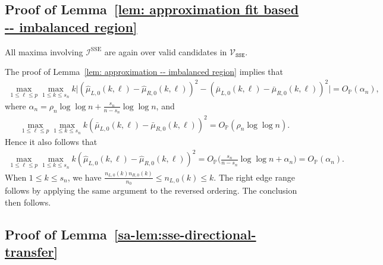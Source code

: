 \documentclass[10pt]{article}
\def\P{\mathbb{P}}
\def\I{\mathscr{I}}
\theoremstyle{definition}
\theoremstyle{remark}
\begin{document}
\subsection{Proof of Lemma~\ref{lem: approximation fit based -- imbalanced region}}
All maxima involving $\I^{\text{SSE}}$ are again over valid candidates in $\mathcal{V}_{\mathtt{SSE}}$.

The proof of Lemma~\ref{lem: approximation -- imbalanced region} implies that
\begin{align*}
    \max_{1 \leq \ell \leq p} \max_{1 \leq k \leq s_n} k\bigg|(\hat \mu_{L,0}(k,\ell) - \hat \mu_{R,0}(k,\ell))^2 - (\bar \mu_{L,0}(k,\ell) - \bar \mu_{R,0}(k,\ell))^2\bigg| = O_\P(\alpha_n),
\end{align*}
where $\alpha_n = \rho_n \log \log n + \frac{s_n}{n - s_n} \log \log n$, and \begin{align*}
    \max_{1 \leq \ell \leq p} \max_{1 \leq k \leq s_n} k (\bar \mu_{L,0}(k,\ell) - \bar \mu_{R,0}(k,\ell))^2  = O_\P(\rho_n \log \log n).
\end{align*}
Hence it also follows that 
\begin{align*}
    \max_{1 \leq \ell \leq p} \max_{1 \leq k \leq s_n} k (\hat \mu_{L,0}(k,\ell) - \hat \mu_{R,0}(k,\ell))^2  = O_\P \Big(\frac{s_n}{n - s_n} \log \log n + \alpha_n \Big) = O_\P(\alpha_n).
\end{align*}
When $1 \leq k \leq s_n$, we have $\frac{n_{L,0}(k) n_{R,0}(k)}{n_0} \leq n_{L,0}(k) \leq k$. The right edge range follows by applying the same argument to the reversed ordering. The conclusion then follows.


\subsection{Proof of Lemma~\ref{sa-lem:sse-directional-transfer}}
\end{document}
